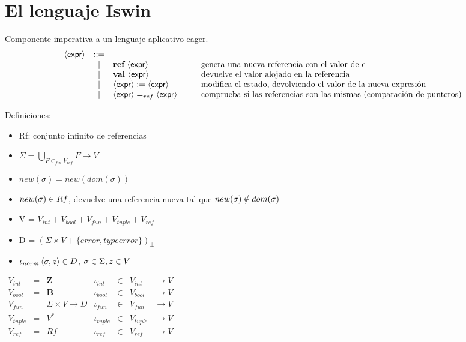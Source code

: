 \section{El lenguaje Iswin}
  \PN Componente imperativa a un lenguaje aplicativo eager.
  \[\begin{array}{rcl@{\hspace{1cm}}l}
    \expr &::=&  \\
      &|& \textbf{ref} \ \expr & \text{genera una nueva referencia con el valor de e} \\
      &|& \textbf{val} \ \expr & \text{devuelve el valor alojado en la referencia} \\
      &|& \expr := \expr & \text{modifica el estado, devolviendo el valor de la nueva expresión} \\
      &|& \expr =_{ref} \expr & \text{comprueba si las referencias son las mismas (comparación de punteros)}
  \end{array}\]

  \pagebreak
  \PN Definiciones:
  \begin{itemize}
    \item Rf: conjunto infinito de referencias
    \item $\Sigma = \bigcup\limits_{F \subset_{fin} V_{ref}} F \to V$
    \item $new(\sigma) = new(dom(\sigma))$
    \item $new(\sigma) \in Rf$, devuelve una referencia nueva tal que $new(\sigma) \notin dom(\sigma)$
    \item V = $V_{int} + V_{bool} + V_{fun} + V_{tuple} + V_{ref}$
    \item D = $(\Sigma \times V + \{error, typeerror\})_{\bot}$
    \item $\iota_{norm} \left\langle \sigma, z \right\rangle \in D$, $\sigma \in \Sigma, z \in V$
  \end{itemize}

  \vspace{3mm}
  $\begin{array}{lllllll}
    V_{int} &=& \mathbf{Z} & \iota_{int} &\in& V_{int} & \rightarrow V \\
    V_{bool} &=& \mathbf{B} & \iota_{bool} &\in& V_{bool} & \rightarrow V \\
    V_{fun} &=& \Sigma \times V \rightarrow D & \iota_{fun} &\in& V_{fun} & \rightarrow V \\
    V_{tuple} &=& V^{\ast} & \iota_{tuple} &\in& V_{tuple} & \rightarrow V \\
    V_{ref} &=& Rf & \iota_{ref} &\in& V_{ref} & \rightarrow V
  \end{array}$

